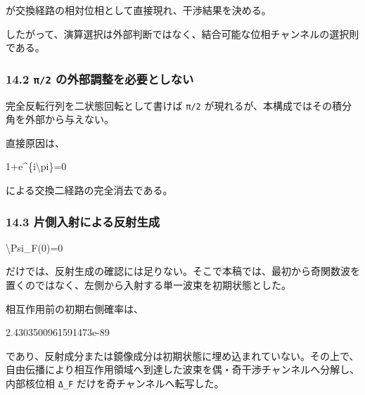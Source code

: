 \documentclass[
  a4paper,
]{article}
\newenvironment{Shaded}{}{}
\newcommand{\NormalTok}[1]{#1}
\begin{document}
が交換経路の相対位相として直接現れ、干渉結果を決める。

したがって、演算選択は外部判断ではなく、結合可能な位相チャンネルの選択則である。

\subsubsection{\texorpdfstring{14.2 \texttt{π/2}
の外部調整を必要としない}{14.2 π/2 の外部調整を必要としない}}\label{ux3c02-ux306eux5916ux90e8ux8abfux6574ux3092ux5fc5ux8981ux3068ux3057ux306aux3044}

完全反転行列を二状態回転として書けば \texttt{π/2}
が現れるが、本構成ではその積分角を外部から与えない。

直接原因は、

\begin{Shaded}
\begin{Highlighting}[]
\NormalTok{1+e\^{}\{i\textbackslash{}pi\}=0}
\end{Highlighting}
\end{Shaded}

による交換二経路の完全消去である。

\subsubsection{14.3
片側入射による反射生成}\label{ux7247ux5074ux5165ux5c04ux306bux3088ux308bux53cdux5c04ux751fux6210}

\begin{Shaded}
\begin{Highlighting}[]
\NormalTok{\textbackslash{}Psi\_F(0)=0}
\end{Highlighting}
\end{Shaded}

だけでは、反射生成の確認には足りない。そこで本稿では、最初から奇関数波を置くのではなく、左側から入射する単一波束を初期状態とした。

相互作用前の初期右側確率は、

\begin{Shaded}
\begin{Highlighting}[]
\NormalTok{2.4303500961591473e{-}89}
\end{Highlighting}
\end{Shaded}

であり、反射成分または鏡像成分は初期状態に埋め込まれていない。その上で、自由伝播により相互作用領域へ到達した波束を偶・奇干渉チャンネルへ分解し、内部核位相
\texttt{Δ\_F} だけを奇チャンネルへ転写した。
\end{document}
